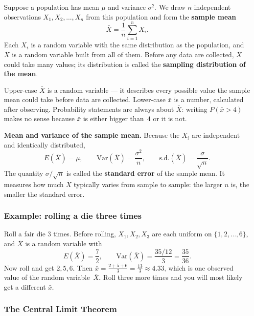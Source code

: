 
Suppose a population has mean $\mu$ and variance $\sigma^2$. We draw $n$
independent observations $X_1, X_2, \ldots, X_n$ from this population and
form the \textbf{sample mean}
\[
\bar{X} = \frac{1}{n}\sum_{i=1}^{n} X_i.
\]
Each $X_i$ is a random variable with the same distribution as the
population, and $\bar{X}$ is a random variable built from all of them.
Before any data are collected, $\bar{X}$ could take many values; its
distribution is called the \textbf{sampling distribution of the mean}.

\begin{remark}
Upper-case $\bar{X}$ is a random variable --- it describes every possible
value the sample mean could take before data are collected.  Lower-case
$\bar{x}$ is a number, calculated after observing.  Probability statements
are always about $\bar{X}$: writing $P(\bar{x} > 4)$ makes no sense because
$\bar{x}$ is either bigger than~$4$ or it is not.
\end{remark}

\textbf{Mean and variance of the sample mean.}
Because the $X_i$ are independent and identically distributed,
\[
E(\bar{X}) = \mu, \qquad
\mathrm{Var}(\bar{X}) = \frac{\sigma^2}{n}, \qquad
\mathrm{s.d.}(\bar{X}) = \frac{\sigma}{\sqrt{n}}.
\]
The quantity $\sigma/\sqrt{n}$ is called the \textbf{standard error} of the
sample mean.  It measures how much $\bar{X}$ typically varies from sample to
sample: the larger $n$ is, the smaller the standard error.

\subsubsection*{Example: rolling a die three times}
Roll a fair die $3$ times.  Before rolling, $X_1, X_2, X_3$ are each
uniform on $\{1,2,\ldots,6\}$, and $\bar{X}$ is a random variable with
\[
E(\bar{X}) = \frac{7}{2}, \qquad
\mathrm{Var}(\bar{X}) = \frac{35/12}{3} = \frac{35}{36}.
\]
Now roll and get $2, 5, 6$.  Then
$\bar{x} = \frac{2+5+6}{3} = \frac{13}{3} \approx 4.33$, which is one
observed value of the random variable~$\bar{X}$.  Roll three more times
and you will most likely get a different $\bar{x}$.

\subsubsection*{The Central Limit Theorem}

